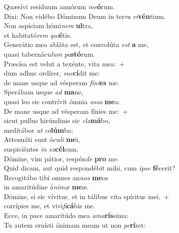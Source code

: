 \evenverse Quæsívi resíduum annórum \textit{me}\textbf{ó}rum.~\*\\
\evenverse Dixi: Non vidébo Dóminum Deum in ter\textit{ra} \textit{vi}\textbf{vén}tium.\\
\oddverse Non aspíciam hómi\textit{nem} \textbf{ul}tra,~\*\\
\oddverse et habitató\textit{rem} \textit{qui}\textbf{é}tis.\\
\evenverse Generátio mea abláta est, et convolúta \textit{est} \textbf{a} me,~\*\\
\evenverse quasi tabernácu\textit{lum} \textit{pa}\textbf{stó}rum.\\
\oddverse Præcísa est velut a texénte, vita mea:~+\\
\oddverse  dum adhuc ordírer, \textit{suc}\textbf{cí}dit me:~\*\\
\oddverse de mane usque ad vésperam \textit{fí}\textit{ni}\textbf{es} me.\\
\evenverse Sperábam usque \textit{ad} \textbf{ma}ne,~\*\\
\evenverse quasi leo sic contrívit ómnia \textit{os}\textit{sa} \textbf{me}a:\\
\oddverse De mane usque ad vésperam fínies me:~+\\
\oddverse  sicut pullus hirúndinis sic \textit{cla}\textbf{má}bo,~\*\\
\oddverse meditábor \textit{ut} \textit{co}\textbf{lúm}ba:\\
\evenverse Attenuáti sunt ócu\textit{li} \textbf{me}i,~\*\\
\evenverse suspiciéntes \textit{in} \textit{ex}\textbf{cél}sum.\\
\oddverse Dómine, vim pátior, respón\textit{de} \textbf{pro} me.~\*\\
\oddverse Quid dicam, aut quid respondébit mihi, cum \textit{i}\textit{pse} \textbf{fé}cerit?\\
\evenverse Recogitábo tibi omnes an\textit{nos} \textbf{me}os~\*\\
\evenverse in amaritúdine á\textit{ni}\textit{mæ} \textbf{me}æ.\\
\oddverse Dómine, si sic vívitur, et in tálibus vita spíritus mei,~+\\
\oddverse  corrípies me, et vivi\textit{fi}\textbf{cá}bis me.~\*\\
\oddverse Ecce, in pace amaritúdo mea \textit{a}\textit{ma}\textbf{rís}sima:\\
\evenverse Tu autem eruísti ánimam meam ut non \textit{pe}\textbf{rí}ret:~\*\\
